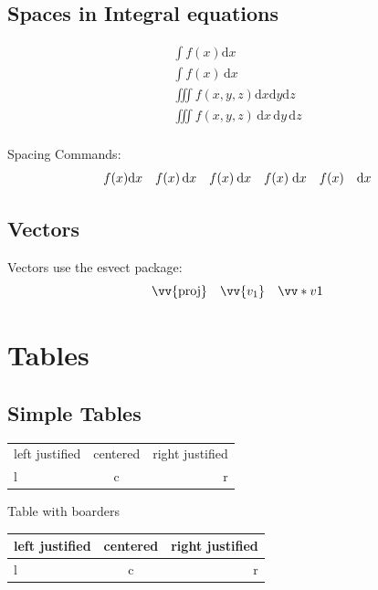 \documentclass[12pt]{article}
\begin{document}
\subsection{Spaces in Integral equations}

\begin{align*}
    \int f(x) \mathrm{d}x \\
    \int f(x) \, \mathrm{d}x \\
    \iiint f(x,y,z) \mathrm{d}x \mathrm{d}y \mathrm{d}z \\
    \iiint f(x,y,z) \, \mathrm{d}x \, \mathrm{d}y \, \mathrm{d}z \\
\end{align*}

Spacing Commands:
\begin{equation*}
    \begin{array}{c c c c c}
        f(x) \mathrm{d}x & f(x) \, \mathrm{d}x & f(x) \: \mathrm{d}x & f(x) \; \mathrm{d}x & f(x) \quad \mathrm{d}x \\
    \end{array}
\end{equation*}

\subsection{Vectors}

Vectors use the esvect package:
\begin{equation*}
    \vv{\mathrm{proj}} \quad \vv{v_1} \quad \vv*{v}{1}
\end{equation*}

\section{Tables}

\subsection{Simple Tables}

\begin{tabular}{lcr}
    left justified & centered & right justified \\
    l & c & r
\end{tabular}

\noindent Table with boarders \\

\noindent
\begin{tabular}{ | l |c r| }
    \hline
    left justified & centered & right justified \\
    \hline
    l & c & r \\
    \hline
\end{tabular}
\end{document}
